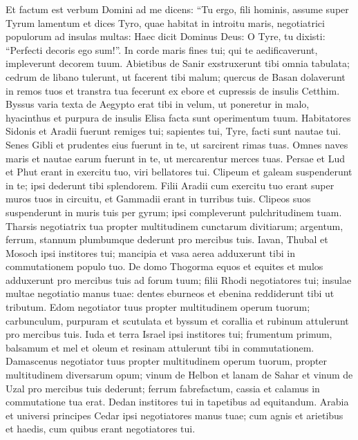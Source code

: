 \begin{biblechapter}  
\verse Et factum est verbum Domini ad me dicens: 
\verse “Tu ergo, fili hominis, assume super Tyrum lamentum 
\verse et dices Tyro, quae habitat in introitu maris, negotiatrici populorum ad insulas multas: Haec dicit Dominus Deus: O Tyre, tu dixisti: “Perfecti decoris ego sum!”. 
\verse In corde maris fines tui; qui te aedificaverunt, impleverunt decorem tuum. 
\verse Abietibus de Sanir exstruxerunt tibi omnia tabulata; cedrum de libano tulerunt, ut facerent tibi malum; 
\verse quercus de Basan dolaverunt in remos tuos et transtra tua fecerunt ex ebore et cupressis de insulis Cetthim. 
\verse Byssus varia texta de Aegypto erat tibi in velum, ut poneretur in malo, hyacinthus et purpura de insulis Elisa facta sunt operimentum tuum. 
\verse Habitatores Sidonis et Aradii fuerunt remiges tui; sapientes tui, Tyre, facti sunt nautae tui. 
\verse Senes Gibli et prudentes eius fuerunt in te, ut sarcirent rimas tuas. Omnes naves maris et nautae earum fuerunt in te, ut mercarentur merces tuas. 
\verse Persae et Lud et Phut erant in exercitu tuo, viri bellatores tui. Clipeum et galeam suspenderunt in te; ipsi dederunt tibi splendorem. 
\verse Filii Aradii cum exercitu tuo erant super muros tuos in circuitu, et Gammadii erant in turribus tuis. Clipeos suos suspenderunt in muris tuis per gyrum; ipsi compleverunt pulchritudinem tuam. 
\verse Tharsis negotiatrix tua propter multitudinem cunctarum divitiarum; argentum, ferrum, stannum plumbumque dederunt pro mercibus tuis. 
\verse Iavan, Thubal et Mosoch ipsi institores tui; mancipia et vasa aerea adduxerunt tibi in commutationem populo tuo. 
\verse De domo Thogorma equos et equites et mulos adduxerunt pro mercibus tuis ad forum tuum;  
\verse filii Rhodi negotiatores tui; insulae multae negotiatio manus tuae: dentes eburneos et ebenina reddiderunt tibi ut tributum. 
\verse Edom negotiator tuus propter multitudinem operum tuorum; carbunculum, purpuram et scutulata et byssum et corallia et rubinum attulerunt pro mercibus tuis. 
\verse Iuda et terra Israel ipsi institores tui; frumentum primum, balsamum et mel et oleum et resinam attulerunt tibi in commutationem. 
\verse Damascenus negotiator tuus propter multitudinem operum tuorum, propter multitudinem diversarum opum; vinum de Helbon et lanam de Sahar 
\verse et vinum de Uzal pro mercibus tuis dederunt; ferrum fabrefactum, cassia et calamus in commutatione tua erat. 
\verse Dedan institores tui in tapetibus ad equitandum. 
\verse Arabia et universi principes Cedar ipsi negotiatores manus tuae; cum agnis et arietibus et haedis, cum quibus erant negotiatores tui.  

\end{biblechapter}
